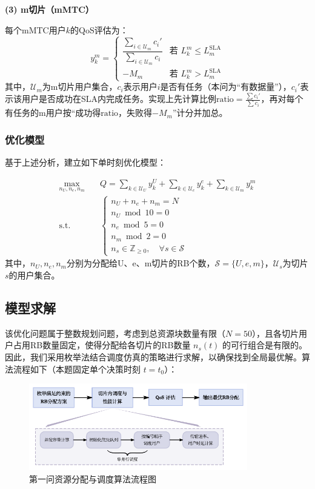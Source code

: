 \textbf{(3) m切片（mMTC）}

每个mMTC用户$k$的QoS评估为：
\begin{equation}
y_k^{m} = \begin{cases}
\dfrac{\sum_{i \in \mathcal{U}_{m}} c_i'}{\sum_{i \in \mathcal{U}_{m}} c_i} & \text{若 } L_k^{m} \le L_{m}^{\text{SLA}} \\
-M_{m} & \text{若 } L_k^{m} > L_{m}^{\text{SLA}}
\end{cases}
\end{equation}
其中，$\mathcal{U}_m$为m切片用户集合，$c_i$表示用户$i$是否有任务（本问为“有数据量”），$c_i'$表示该用户是否成功在SLA内完成任务。实现上先计算比例$\text{ratio}=\frac{\sum c_i'}{\sum c_i}$，再对每个有任务的m用户按“成功得$\text{ratio}$，失败得$-M_m$”计分并加总。

\subsubsection{优化模型}

基于上述分析，建立如下单时刻优化模型：

\begin{equation}
\begin{aligned}
\max_{n_U, n_e, n_m} \quad & Q = \sum_{k \in \mathcal{U}_U} y_k^{U} + \sum_{k \in \mathcal{U}_e} y_k^{e} + \sum_{k \in \mathcal{U}_m} y_k^{m} \\
\text{s.t.} \quad & \begin{cases}
 n_U + n_e + n_m = N \\
 n_U \bmod 10 = 0 \\
 n_e \bmod 5 = 0 \\
 n_m \bmod 2 = 0 \\
 n_s \in \mathbb{Z}_{\ge 0}, \quad \forall s \in \mathcal{S}
 \end{cases}
 \end{aligned}
 \end{equation}
其中，$n_U, n_e, n_m$分别为分配给U、e、m切片的RB个数，$\mathcal{S}=\{U,e,m\}$，$\mathcal{U}_s$为切片$s$的用户集合。
\subsection{模型求解}

该优化问题属于整数规划问题，考虑到总资源块数量有限（$N=50$），且各切片用户占用RB数量固定，使得分配给各切片的RB数量 $n_s(t)$ 的可行组合是有限的。因此，我们采用枚举法结合调度仿真的策略进行求解，以确保找到全局最优解。算法流程如下（本题固定单个决策时刻 $t=t_0$）：
\begin{figure}[H]
    \centering
    \includegraphics[width=0.85\textwidth]{figures/第一问算法.pdf}
    \caption{第一问资源分配与调度算法流程图}
    \label{fig:q1_algorithm_flow}
\end{figure}

